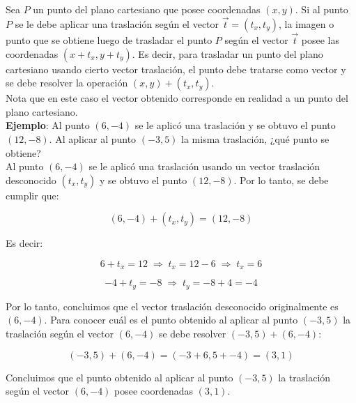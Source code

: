 \noindent Sea $P$ un punto del plano cartesiano que posee coordenadas $(x,y)$. Si al punto $P$ se le debe aplicar una traslación según el vector $\vec{t}=(t_x, t_y)$, la imagen o punto que se obtiene luego de trasladar el punto $P$ según el vector $\vec t$ posee las coordenadas $(x+t_x, y+t_y)$. Es decir, para trasladar un punto del plano cartesiano usando cierto vector traslación, el punto debe tratarse como vector y se debe resolver la operación $(x,y)+(t_x,t_y)$.\\

\noindent Nota que en este caso el vector obtenido corresponde en realidad a un punto del plano cartesiano.\\

\noindent \textbf{Ejemplo}: Al punto $(6,-4)$ se le aplicó una traslación y se obtuvo el punto $(12,-8)$. Al aplicar al punto $(-3,5)$ la misma traslación, ¿qué punto se obtiene?\\

\noindent Al punto $(6,-4)$ se le aplicó una traslación usando un vector traslación desconocido $(t_x,t_y)$ y se obtuvo el punto $(12,-8)$. Por lo tanto, se debe cumplir que:

$$(6,-4)+(t_x,t_y)=(12,-8)$$
\vspace*{.1cm}

\noindent Es decir:

$$6+t_x=12 \; \Rightarrow\; t_x=12-6 \;\Rightarrow\; t_x=6$$

$$-4+t_y=-8 \; \Rightarrow\; t_y=-8+4=-4$$
\vspace*{.1cm}

\noindent Por lo tanto, concluimos que el vector traslación desconocido originalmente es $(6,-4)$. Para conocer cuál es el punto obtenido al aplicar al punto $(-3,5)$ la traslación según el vector $(6,-4)$ se debe resolver $(-3,5)+(6,-4)$: 

$$(-3,5)+(6,-4)=(-3+6,5+-4)=(3,1)$$
\vspace*{.1cm}

\noindent Concluimos que el punto obtenido al aplicar al punto $(-3,5)$ la traslación según el vector $(6,-4)$ posee coordenadas $(3,1)$.
